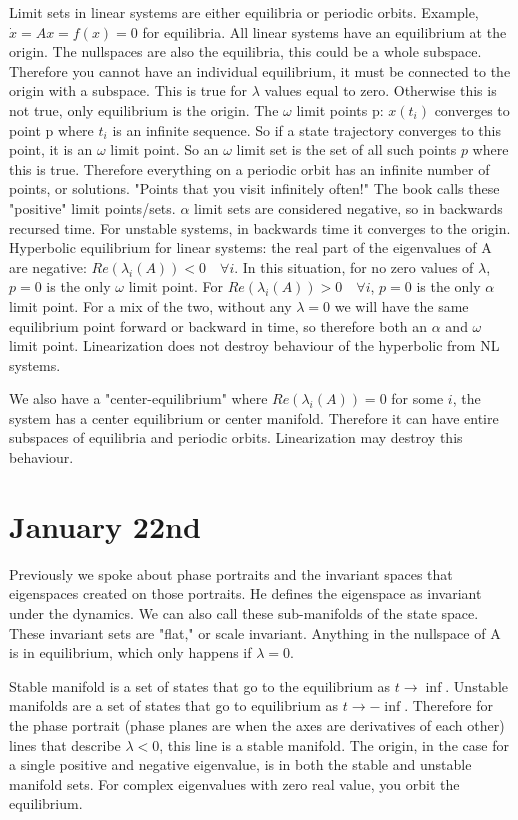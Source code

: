 \documentclass[11pt]{article}
\begin{document}
Limit sets in linear systems are either equilibria or periodic orbits. Example, $\dot{x} = Ax = f(x) = 0$ for equilibria. All linear systems have an equilibrium at the origin. The nullspaces are also the equilibria, this could be a whole subspace. Therefore you cannot have an individual equilibrium, it must be connected to the origin with a subspace. This is true for $\lambda$ values equal to zero. Otherwise this is not true, only equilibrium is the origin. The $\omega$ limit points p: $x(t_i)$ converges to point p where $t_i$ is an infinite sequence. So if a state trajectory converges to this point, it is an $\omega$ limit point. So an $\omega$ limit set is the set of all such points $p$ where this is true. Therefore everything on a periodic orbit has an infinite number of points, or solutions. "Points that you visit infinitely often!" The book calls these "positive" limit points/sets. $\alpha$ limit sets are considered negative, so in backwards recursed time. For unstable systems, in backwards time it converges to the origin. Hyperbolic equilibrium for linear systems: the real part of the eigenvalues of A are negative: $Re(\lambda_i(A))<0 \quad \forall i$. In this situation, for no zero values of $\lambda$, $p=0$ is the only $\omega$ limit point. For $Re(\lambda_i(A))>0 \quad \forall i$, $p=0$ is the only $\alpha$ limit point. For a mix of the two, without any $\lambda =0$ we will have the same equilibrium point forward or backward in time, so therefore both an $\alpha$ and $\omega$ limit point. Linearization does not destroy behaviour of the hyperbolic from NL systems.

We also have a "center-equilibrium" where $Re(\lambda_i(A))=0$ for some $i$, the system has a center equilibrium or center manifold. Therefore it can have entire subspaces of equilibria and periodic orbits. Linearization may destroy this behaviour.


\section*{January 22nd}
Previously we spoke about phase portraits and the invariant spaces that eigenspaces created on those portraits. He defines the eigenspace as invariant under the dynamics. We can also call these sub-manifolds of the state space. These invariant sets are "flat," or scale invariant. Anything in the nullspace of A is in equilibrium, which only happens if $\lambda = 0$. 

Stable manifold is a set of states that go to the equilibrium as $t \to \inf$. Unstable manifolds are a set of states that go to equilibrium as $t \to -\inf$. Therefore for the phase portrait (phase planes are when the axes are derivatives of each other) lines that describe $\lambda < 0$, this line is a stable manifold. The origin, in the case for a single positive and negative eigenvalue, is in both the stable and unstable manifold sets. For complex eigenvalues with zero real value, you orbit the equilibrium.
\end{document}
